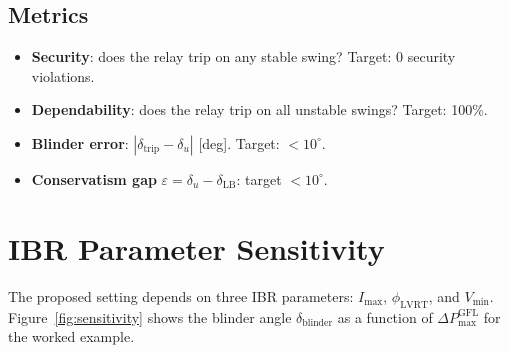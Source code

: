 \documentclass[11pt,a4paper]{article}
\newcommand{\du}{\delta_u}         %
\newcommand{\dlb}{\delta_{\mathrm{LB}}}   %
\begin{document}
\subsection{Metrics}
\begin{itemize}
  \item \textbf{Security}: does the relay trip on any stable swing?
        Target: 0 security violations.
  \item \textbf{Dependability}: does the relay trip on all unstable swings?
        Target: 100\%.
  \item \textbf{Blinder error}: $|\delta_{\mathrm{trip}} - \du|$ [deg].
        Target: $< 10^\circ$.
  \item \textbf{Conservatism gap} $\varepsilon = \du - \dlb$: target $< 10^\circ$.
\end{itemize}

\section{IBR Parameter Sensitivity}
\label{sec:sensitivity}

The proposed setting depends on three IBR parameters:
$I_{\max}$, $\phi_{\mathrm{LVRT}}$, and $V_{\min}$.
Figure~\ref{fig:sensitivity} shows the blinder angle $\delta_{\mathrm{blinder}}$
as a function of $\Delta P_{\max}^{\mathrm{GFL}}$ for the worked example.
\end{document}
